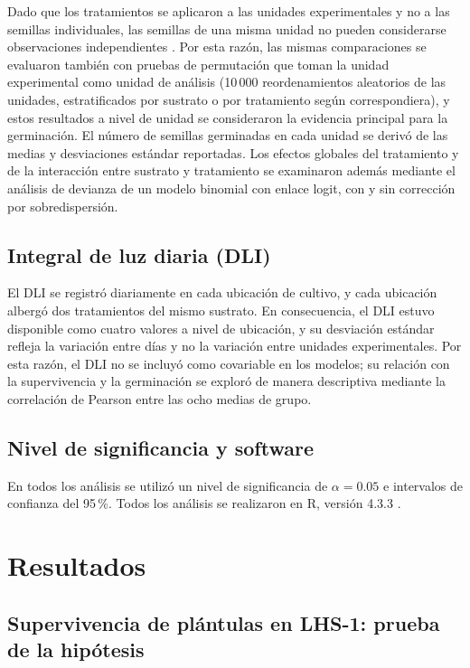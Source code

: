 \documentclass[11pt]{article}
\begin{document}
Dado que los tratamientos se aplicaron a las unidades experimentales y no a las semillas individuales, las semillas de una misma unidad no pueden considerarse observaciones independientes \citep{hurlbert}. Por esta razón, las mismas comparaciones se evaluaron también con pruebas de permutación que toman la unidad experimental como unidad de análisis (10\,000 reordenamientos aleatorios de las unidades, estratificados por sustrato o por tratamiento según correspondiera), y estos resultados a nivel de unidad se consideraron la evidencia principal para la germinación. El número de semillas germinadas en cada unidad se derivó de las medias y desviaciones estándar reportadas. Los efectos globales del tratamiento y de la interacción entre sustrato y tratamiento se examinaron además mediante el análisis de devianza de un modelo binomial con enlace logit, con y sin corrección por sobredispersión.

\subsection{Integral de luz diaria (DLI)}

El DLI se registró diariamente en cada ubicación de cultivo, y cada ubicación albergó dos tratamientos del mismo sustrato. En consecuencia, el DLI estuvo disponible como cuatro valores a nivel de ubicación, y su desviación estándar refleja la variación entre días y no la variación entre unidades experimentales. Por esta razón, el DLI no se incluyó como covariable en los modelos; su relación con la supervivencia y la germinación se exploró de manera descriptiva mediante la correlación de Pearson entre las ocho medias de grupo.

\subsection{Nivel de significancia y software}

En todos los análisis se utilizó un nivel de significancia de $\alpha = 0.05$ e intervalos de confianza del 95\,\%. Todos los análisis se realizaron en R, versión 4.3.3 \citep{rcore}.

\section{Resultados}

\subsection{Supervivencia de plántulas en LHS-1: prueba de la hipótesis}
\end{document}

